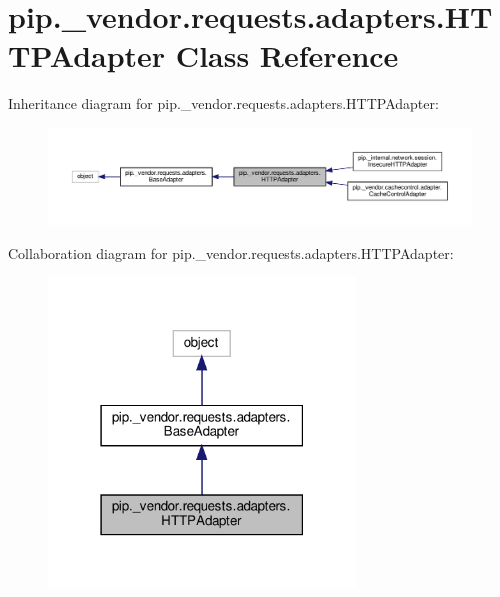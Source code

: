 \hypertarget{classpip_1_1__vendor_1_1requests_1_1adapters_1_1HTTPAdapter}{}\section{pip.\+\_\+vendor.\+requests.\+adapters.\+H\+T\+T\+P\+Adapter Class Reference}
\label{classpip_1_1__vendor_1_1requests_1_1adapters_1_1HTTPAdapter}


Inheritance diagram for pip.\+\_\+vendor.\+requests.\+adapters.\+H\+T\+T\+P\+Adapter\+:
\nopagebreak
\begin{figure}[H]
\begin{center}
\leavevmode
\includegraphics[width=350pt]{classpip_1_1__vendor_1_1requests_1_1adapters_1_1HTTPAdapter__inherit__graph}
\end{center}
\end{figure}


Collaboration diagram for pip.\+\_\+vendor.\+requests.\+adapters.\+H\+T\+T\+P\+Adapter\+:
\nopagebreak
\begin{figure}[H]
\begin{center}
\leavevmode
\includegraphics[width=231pt]{classpip_1_1__vendor_1_1requests_1_1adapters_1_1HTTPAdapter__coll__graph}
\end{center}
\end{figure}
